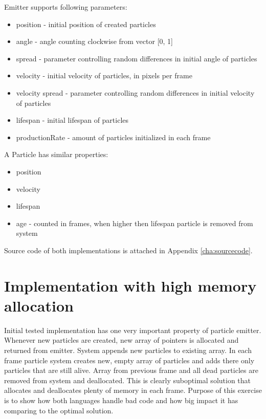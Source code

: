 Emitter supports following parameters:

\begin{itemize}
	\item position - initial position of created particles
	\item angle - angle counting clockwise from vector [0, 1]
	\item spread - parameter controlling random differences in initial angle of particles
	\item velocity - initial velocity of particles, in pixels per frame
	\item velocity spread - parameter controlling random differences in initial velocity of particles
	\item lifespan - initial lifespan of particles
	\item productionRate - amount of particles initialized in each frame
\end{itemize}

A Particle has similar properties:
\begin{itemize}
	\item position
	\item velocity
	\item lifespan
	\item age - counted in frames, when higher then lifespan particle is removed from system
\end{itemize}

Source code of both implementations is attached in Appendix \ref{cha:sourcecode}.

\section{Implementation with high memory allocation}
\label{sec:particlesinitial}

Initial tested implementation has one very important property of particle emitter. Whenever new particles are created, new array of pointers is allocated and returned from emitter. System appends new particles to existing array. In each frame particle system creates new, empty array of particles and adds there only particles that are still alive. Array from previous frame and all dead particles are removed from system and deallocated. This is clearly suboptimal solution that allocates and deallocates plenty of memory in each frame. Purpose of this exercise is to show how both languages handle bad code and how big impact it has comparing to the optimal solution.

